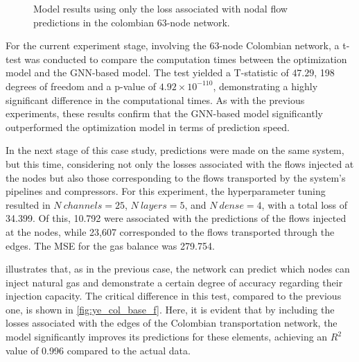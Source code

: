 \begin{figure}
    \centering
        \setlength{}        
        \setlength{} 
    \caption{Model results using only the loss associated with nodal flow predictions in the colombian 63-node network.}
    \label{fig:lineal_col_base_results}
\end{figure}


For the current experiment stage, involving the 63-node Colombian network, a t-test was conducted to compare the computation times between the optimization model and the GNN-based model. The test yielded a T-statistic of $47.29$, 198 degrees of freedom and a p-value of $4.92 \times 10^{-110}$, demonstrating a highly significant difference in the computational times. As with the previous experiments, these results confirm that the GNN-based model significantly outperformed the optimization model in terms of prediction speed.


In the next stage of this case study, predictions were made on the same system, but this time, considering not only the losses associated with the flows injected at the nodes but also those corresponding to the flows transported by the system's pipelines and compressors. For this experiment, the hyperparameter tuning resulted in $N \ channels = 25$, $N \ layers = 5$, and $N \ dense = 4$, with a total loss of 34.399. Of this, 10.792 were associated with the predictions of the flows injected at the nodes, while 23,607 corresponded to the flows transported through the edges. The MSE for the gas balance was 279.754.

 illustrates that, as in the previous case, the network can predict which nodes can inject natural gas and demonstrate a certain degree of accuracy regarding their injection capacity. The critical difference in this test, compared to the previous one, is shown in \cref{fig:ye_col_base_f}. Here, it is evident that by including the losses associated with the edges of the Colombian transportation network, the model significantly improves its predictions for these elements, achieving an $R^2$ value of 0.996 compared to the actual data.


